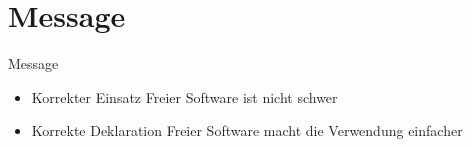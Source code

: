 \section{Message}

\begin{frame}{Message}
	\begin{itemize}
		\item Korrekter Einsatz Freier Software ist nicht schwer
		\item Korrekte Deklaration Freier Software macht die Verwendung einfacher
	\end{itemize}
	\\
	\\
	\\
	\\
	\\
\end{frame}
